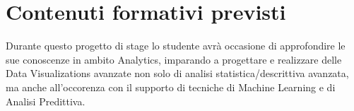 \section*{Contenuti formativi previsti}
Durante questo progetto di stage lo studente avrà occasione di approfondire le sue conoscenze in ambito Analytics, imparando a progettare e realizzare delle Data Visualizations avanzate non solo di analisi statistica/descrittiva avanzata, ma anche all'occorenza con il supporto di tecniche di Machine Learning e di Analisi Predittiva.

\pagebreak